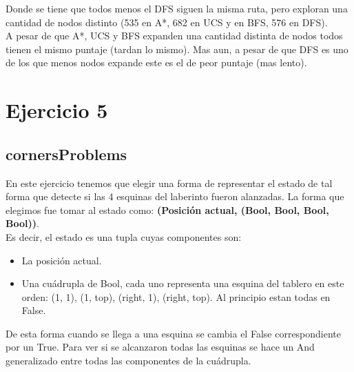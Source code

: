 \documentclass[12pt, titlepage, a4paper]{article}
\begin{document}
Donde se tiene que todos menos el DFS siguen la misma ruta, pero 
exploran una cantidad de nodos distinto (535 en A*, 682 en UCS y en BFS, 576 en DFS). \\

A pesar de que A*, UCS y BFS expanden una cantidad distinta de nodos 
todos tienen el mismo puntaje (tardan lo mismo). Mas aun, a pesar de que DFS es uno de los que 
menos nodos expande este es el de peor puntaje (mas lento).



\section{Ejercicio 5}
\subsection{cornersProblems}
En este ejercicio tenemos que elegir una forma de representar el estado de 
tal forma que detecte si las 4 esquinas del laberinto fueron alanzadas. La 
forma que elegimos fue tomar al estado como: \textbf{(Posición actual, (Bool, Bool, Bool, Bool))}.\\

\noindent Es decir, el estado es una tupla cuyas componentes son:
\begin{itemize}
    \item {La posición actual.}
    \item {Una cuádrupla de Bool, cada uno representa una esquina del tablero en este orden: (1, 1), (1, top), (right, 1), (right, top). Al 
        principio estan todas en False.}
\end{itemize}

De esta forma cuando se llega a una esquina se cambia el False correspondiente por 
un True. Para ver si se alcanzaron todas las esquinas se hace un And generalizado 
entre todas las componentes de la cuádrupla.\\
\end{document}
